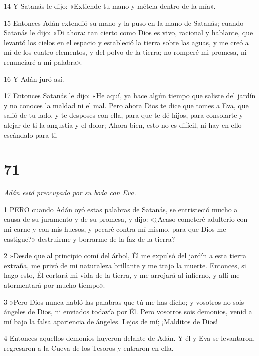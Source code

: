 \par 14 Y Satanás le dijo: «Extiende tu mano y métela dentro de la mía».

\par 15 Entonces Adán extendió su mano y la puso en la mano de Satanás; cuando Satanás le dijo: «Di ahora: tan cierto como Dios es vivo, racional y hablante, que levantó los cielos en el espacio y estableció la tierra sobre las aguas, y me creó a mí de los cuatro elementos, y del polvo de la tierra; no romperé mi promesa, ni renunciaré a mi palabra».

\par 16 Y Adán juró así.

\par 17 Entonces Satanás le dijo: «He aquí, ya hace algún tiempo que saliste del jardín y no conoces la maldad ni el mal. Pero ahora Dios te dice que tomes a Eva, que salió de tu lado, y te desposes con ella, para que te dé hijos, para consolarte y alejar de ti la angustia y el dolor; Ahora bien, esto no es difícil, ni hay en ello escándalo para ti.

\chapter{71}

\par \textit{Adán está preocupado por su boda con Eva.}

\par 1 PERO cuando Adán oyó estas palabras de Satanás, se entristeció mucho a causa de su juramento y de su promesa, y dijo: «¿Acaso cometeré adulterio con mi carne y con mis huesos, y pecaré contra mí mismo, para que Dios me castigue?» destruirme y borrarme de la faz de la tierra?

\par 2 »Desde que al principio comí del árbol, Él me expulsó del jardín a esta tierra extraña, me privó de mi naturaleza brillante y me trajo la muerte. Entonces, si hago esto, Él cortará mi vida de la tierra, y me arrojará al infierno, y allí me atormentará por mucho tiempo».

\par 3 »Pero Dios nunca habló las palabras que tú me has dicho; y vosotros no sois ángeles de Dios, ni enviados todavía por Él. Pero vosotros sois demonios, venid a mí bajo la falsa apariencia de ángeles. Lejos de mí; ¡Malditos de Dios!

\par 4 Entonces aquellos demonios huyeron delante de Adán. Y él y Eva se levantaron, regresaron a la Cueva de los Tesoros y entraron en ella.

